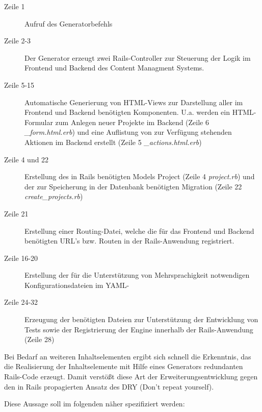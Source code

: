 \begin{description}
\item[Zeile 1]
Aufruf des Generatorbefehls
\item[Zeile 2-3]
Der Generator erzeugt zwei Rails-Controller zur Steuerung der Logik im Frontend und Backend des Content Managment Systems.
\item[Zeile 5-15]
Automatische Generierung von HTML-Views zur Darstellung aller im Frontend und Backend benötigten Komponenten. U.a. werden ein HTML-Formular zum Anlegen neuer Projekte im Backend (Zeile 6 \emph{\_form.html.erb}) und eine Auflistung von zur Verfügung stehenden Aktionen im Backend erstellt (Zeile 5 \emph{\_actions.html.erb})
\item[Zeile 4 und 22]
Erstellung des in Rails benötigten Models Project (Zeile 4 \emph{project.rb}) und der zur Speicherung in der Datenbank benötigten Migration (Zeile 22 \emph{create\_projects.rb})
\item[Zeile 21]
Erstellung einer Routing-Datei, welche die für das Frontend und Backend benötigten URL's bzw. Routen in der Rails-Anwendung registriert.
\item[Zeile 16-20]
Erstellung der für die Unterstützung von Mehrsprachigkeit notwendigen Konfigurationsdateien im YAML-
\item[Zeile 24-32]
Erzeugung der benötigten Dateien zur Unterstützung der Entwicklung von Tests sowie der Registrierung der Engine innerhalb der Rails-Anwendung (Zeile 28)
\end{description}

Bei Bedarf an weiteren Inhaltselementen ergibt sich schnell die Erkenntnis, das die Realisierung der Inhaltselemente mit Hilfe eines Generators redundanten Rails-Code erzeugt. Damit verstößt diese Art der Erweiterungsentwicklung gegen den in Rails propagierten Ansatz des DRY (Don't repeat yourself).

Diese Aussage soll im folgenden näher spezifiziert werden:


